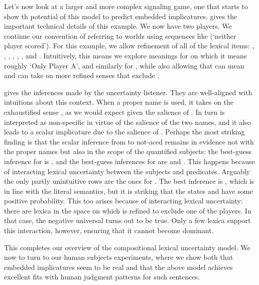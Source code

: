 \documentclass[leqno]{article}
\begin{document}
Let's now look at a larger and more complex signaling game, one that
starts to show th potential of this model to predict embedded
implicatures.  gives the important technical
details of this example. We now have two players. We continue our
convention of referring to worlds using sequences like 
(`neither player scored'). For this example, we allow refinement of
all of the lexical items: , ,
, , , , and .
Intuitively, this means we explore meanings for  on
which it means roughly `Only Player A', and similarly for , while also allowing that  can mean  and  can take on more refined senses that exclude
.

 gives the inferences made by the uncertainty
listener. They are well-aligned with intuitions about this context.
When a proper name  is used, it takes on the exhaustified
sense , as we would expect given the salience of
. In turn  is interpreted as non-specific in
virtue of the salience of the two names, and it also leads to a scalar
implicature due to the salience of . Perhaps the most
striking finding is that the scalar inference from  to
not-aced remains in evidence not with the proper names but also in the
scope of the quantified subjects: the best-guess inference for
 is , and the best-guess
inferences for  are  and
. This happens because of interacting lexical uncertainty
between the subjects and predicates. Arguably the only partly
unintuitive rows are the ones for .  The best
inference is , which is in line with the literal semantics,
but it is striking that the states  and  have some
positive probability. This too arises because of interacting lexical
uncertainty: there are lexica in the space on which  is
refined to exclude one of the players.  In that case, the negative
universal turns out to be true. Only a few lexica support this
interaction, however, ensuring that it cannot become dominant.

This completes our overview of the compositional lexical uncertainty
model. We now to turn to our human subjects experiments, where we show
both that embedded implicatures seem to be real and that the above
model achieves excellent fits with human judgment patterns for such
sentences.
\end{document}
